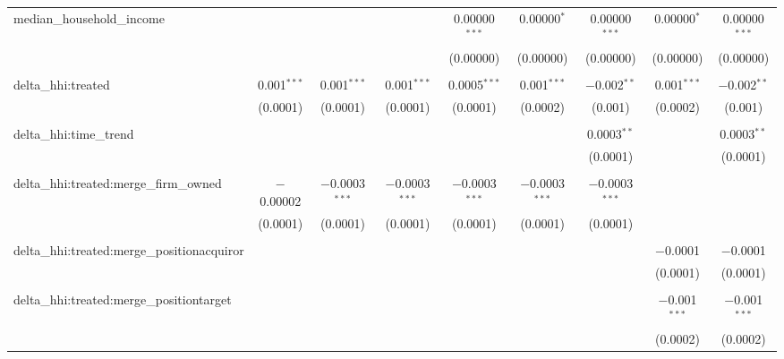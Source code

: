 \begin{table}[H]
{\begin{tabular}{@{\extracolsep{5pt}}lcccccccc}
  median\_household\_income &  &  &  & 0.00000$^{***}$ & 0.00000$^{*}$ & 0.00000$^{***}$ & 0.00000$^{*}$ & 0.00000$^{***}$ \\  

   &  &  &  & (0.00000) & (0.00000) & (0.00000) & (0.00000) & (0.00000) \\  

   & & & & & & & & \\  

  delta\_hhi:treated & 0.001$^{***}$ & 0.001$^{***}$ & 0.001$^{***}$ & 0.0005$^{***}$ & 0.001$^{***}$ & $-$0.002$^{**}$ & 0.001$^{***}$ & $-$0.002$^{**}$ \\  

   & (0.0001) & (0.0001) & (0.0001) & (0.0001) & (0.0002) & (0.001) & (0.0002) & (0.001) \\  

   & & & & & & & & \\  

  delta\_hhi:time\_trend &  &  &  &  &  & 0.0003$^{**}$ &  & 0.0003$^{**}$ \\  

   &  &  &  &  &  & (0.0001) &  & (0.0001) \\  

   & & & & & & & & \\  

  delta\_hhi:treated:merge\_firm\_owned & $-$0.00002 & $-$0.0003$^{***}$ & $-$0.0003$^{***}$ & $-$0.0003$^{***}$ & $-$0.0003$^{***}$ & $-$0.0003$^{***}$ &  &  \\  

   & (0.0001) & (0.0001) & (0.0001) & (0.0001) & (0.0001) & (0.0001) &  &  \\  

   & & & & & & & & \\  

  delta\_hhi:treated:merge\_positionacquiror &  &  &  &  &  &  & $-$0.0001 & $-$0.0001 \\  

   &  &  &  &  &  &  & (0.0001) & (0.0001) \\  

   & & & & & & & & \\  

  delta\_hhi:treated:merge\_positiontarget &  &  &  &  &  &  & $-$0.001$^{***}$ & $-$0.001$^{***}$ \\  

   &  &  &  &  &  &  & (0.0002) & (0.0002) \\  


\end{tabular}}
\end{table}
